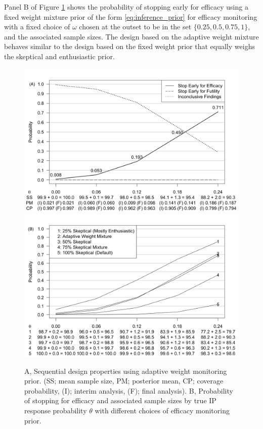 \documentclass[useAMS,usenatbib,referee]{biom}
\begin{document}
Panel B of Figure \ref{fig:ex2varyomega} shows the probability of stopping early for efficacy using a fixed weight mixture prior of the form \eqref{eq:inference_prior}  for efficacy monitoring with a fixed choice of $\omega$ chosen at the outset to be in the set $\{0.25,0.5,0.75,1\}$, and the associated sample sizes.
%
%
The design based on the adaptive weight mixture behaves similar to the design based on the fixed weight prior that equally weighs the skeptical and enthusiastic prior.

\begin{figure}\begin{center}
      \includegraphics[width=6in]{figure9.png}
   \includegraphics[width=6in]{figure6.png}
    \caption{A, Sequential design properties using adaptive weight monitoring prior. (SS; mean sample size, PM; posterior mean, CP; coverage probability, (I); interim analysis, (F); final analysis). B, Probability of stopping for efficacy and associated sample sizes by true IP response probability $\theta$ with different choices of efficacy monitoring prior.}
\label{fig:ex2varyomega}
 \end{center}
\end{figure}
\end{document}
